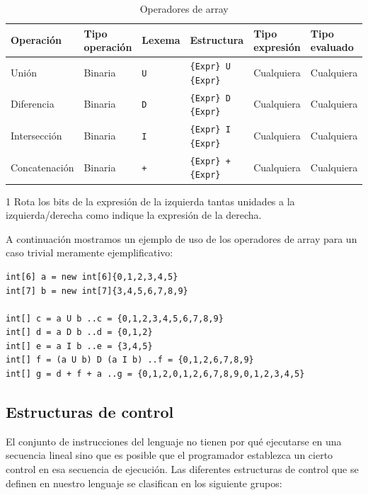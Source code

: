\documentclass[11pt, english]{article}
\begin{document}
\begin{table}[H]
	\begin{center}
		\caption{Operadores de array}\label{tab:array-op}
		\begin{threeparttable}
			\begin{tabular}{l|l|l|l|l|l}
				\toprule
				\textbf{Operación} & \textbf{Tipo operación} & \textbf{Lexema} & \textbf{Estructura} & \textbf{Tipo expresión} & \textbf{Tipo evaluado}\\
				\midrule
				Unión & Binaria & \texttt{U} & \texttt{\{Expr\} U \{Expr\}} & Cualquiera & Cualquiera\\
				Diferencia & Binaria & \texttt{D} & \texttt{\{Expr\} D \{Expr\}} & Cualquiera & Cualquiera\\
				Intersección & Binaria & \texttt{I} & \texttt{\{Expr\} I \{Expr\}} & Cualquiera & Cualquiera\\
				Concatenación & Binaria & \texttt{+} & \texttt{\{Expr\} + \{Expr\}} & Cualquiera & Cualquiera\\
				\bottomrule
			\end{tabular}
			\begin{tablenotes}
				\small
				\item[1] Rota los bits de la expresión de la izquierda tantas unidades a la izquierda/derecha como indique la expresión de la derecha.
			\end{tablenotes}
		\end{threeparttable}
	\end{center}
\end{table}

A continuación mostramos un ejemplo de uso de los operadores de array para un caso trivial meramente ejemplificativo:
\begin{lstlisting}[caption=Ejemplo de uso de operadores de array]
int[6] a = new int[6]{0,1,2,3,4,5}
int[7] b = new int[7]{3,4,5,6,7,8,9}

int[] c = a U b ..c = {0,1,2,3,4,5,6,7,8,9}
int[] d = a D b ..d = {0,1,2}
int[] e = a I b ..e = {3,4,5}
int[] f = (a U b) D (a I b) ..f = {0,1,2,6,7,8,9}
int[] g = d + f + a ..g = {0,1,2,0,1,2,6,7,8,9,0,1,2,3,4,5}
\end{lstlisting}

\subsection{Estructuras de control}
El conjunto de instrucciones del lenguaje no tienen por qué ejecutarse en una secuencia lineal sino que es posible que el programador establezca un cierto control en esa secuencia de ejecución. Las diferentes estructuras de control que se definen en nuestro lenguaje se clasifican en los siguiente grupos:
\end{document}
